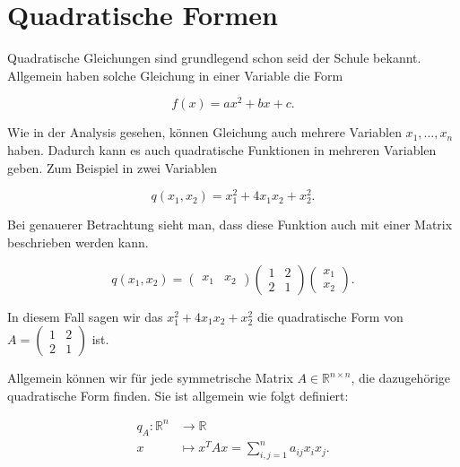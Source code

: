 \setcounter{section}{6}
\section{Quadratische Formen}

Quadratische Gleichungen sind grundlegend schon seid der Schule bekannt. Allgemein haben solche Gleichung in einer Variable die Form

\begin{equation*}
    f(x) = ax^2 + bx + c.
\end{equation*}

Wie in der Analysis gesehen, können Gleichung auch mehrere Variablen \( x_1, \dots, x_n \) haben. Dadurch kann es auch quadratische Funktionen in mehreren Variablen geben. Zum Beispiel in zwei Variablen

\begin{equation*}
    q(x_1,x_2) = x_1^2 + 4x_1x_2 + x_2^2.
\end{equation*}

Bei genauerer Betrachtung sieht man, dass diese Funktion auch mit einer Matrix beschrieben werden kann. 

\begin{equation*}
    q(x_1, x_2) = \begin{pmatrix} x_1 & x_2 \end{pmatrix} \begin{pmatrix} 1 & 2 \\ 2 & 1 \end{pmatrix} \begin{pmatrix} x_1 \\ x_2 \end{pmatrix}.
\end{equation*}

In diesem Fall sagen wir das \( x_1^2 + 4x_1x_2 + x_2^2 \) die quadratische Form von \( A = \begin{pmatrix} 1 & 2 \\ 2 & 1 \end{pmatrix} \) ist.

Allgemein können wir für jede symmetrische Matrix \( A \in \mathbb{R}^{n \times n} \), die dazugehörige quadratische Form finden. Sie ist allgemein wie folgt definiert:

\begin{equation*}
    \begin{aligned}
        q_A: \mathbb{R}^n &\longrightarrow \mathbb{R} \\
        x &\longmapsto x^T A x = \sum_{i,j=1}^{n} a_{ij}x_i x_j.
    \end{aligned}
\end{equation*}


